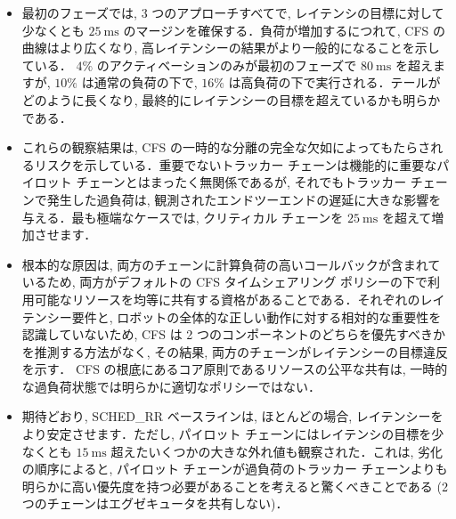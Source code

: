 \begin{frame}{}
    \begin{itemize}
        \item 最初のフェーズでは, 3 つのアプローチすべてで, レイテンシの目標に対して少なくとも $25 \mathrm{~ms}$ のマージンを確保する．負荷が増加するにつれて, CFS の曲線はより広くなり, 高レイテンシーの結果がより一般的になることを示している． $4 \%$ のアクティベーションのみが最初のフェーズで $80 \mathrm{~ms}$ を超えますが, $10 \%$ は通常の負荷の下で, $16 \%$ は高負荷の下で実行される．テールがどのように長くなり, 最終的にレイテンシーの目標を超えているかも明らかである．
    \end{itemize}
\end{frame}

\begin{frame}{}
    \begin{itemize}
        \item これらの観察結果は, CFS の一時的な分離の完全な欠如によってもたらされるリスクを示している．重要でないトラッカー チェーンは機能的に重要なパイロット チェーンとはまったく無関係であるが, それでもトラッカー チェーンで発生した過負荷は, 観測されたエンドツーエンドの遅延に大きな影響を与える．最も極端なケースでは, クリティカル チェーンを $25 \mathrm{~ms}$ を超えて増加させます．
    \end{itemize}
\end{frame}

\begin{frame}{}
    \begin{itemize}
        \item 根本的な原因は, 両方のチェーンに計算負荷の高いコールバックが含まれているため, 両方がデフォルトの CFS タイムシェアリング ポリシーの下で利用可能なリソースを均等に共有する資格があることである．それぞれのレイテンシー要件と, ロボットの全体的な正しい動作に対する相対的な重要性を認識していないため, CFS は 2 つのコンポーネントのどちらを優先すべきかを推測する方法がなく, その結果, 両方のチェーンがレイテンシーの目標違反を示す． CFS の根底にあるコア原則であるリソースの公平な共有は, 一時的な過負荷状態では明らかに適切なポリシーではない．
    \end{itemize}
\end{frame}

\begin{frame}{}
    \begin{itemize}
        \item 期待どおり, SCHED\_RR ベースラインは, ほとんどの場合, レイテンシーをより安定させます．ただし, パイロット チェーンにはレイテンシの目標を少なくとも $15 \mathrm{~ms}$ 超えたいくつかの大きな外れ値も観察された．これは, 劣化の順序によると, パイロット チェーンが過負荷のトラッカー チェーンよりも明らかに高い優先度を持つ必要があることを考えると驚くべきことである (2 つのチェーンはエグゼキュータを共有しない)．
    \end{itemize}
\end{frame}

